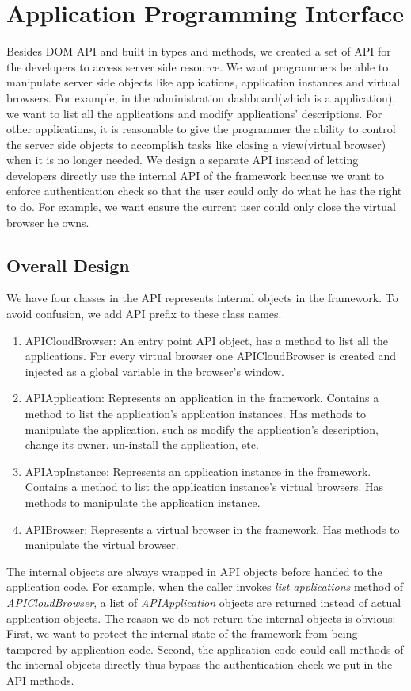 \chapter{Application Programming Interface}
\label{ch:api}
Besides DOM API and built in types and methods,
we created a set of API for the developers to access server side resource.
We want programmers be able to manipulate server side objects like
applications, application instances and virtual browsers.
For example, in the administration dashboard(which is a \cb application),
we want to list all the applications and modify applications' descriptions.
For other applications, it is reasonable to give the programmer
the ability to control the server side objects to accomplish
tasks like closing a view(virtual browser) when it is no longer needed.
We design a separate API instead of letting developers directly use the internal
API of the framework because we want to enforce authentication check so that 
the user could only do what he has the right to do.
For example, we want ensure the current user could only close the virtual browser
he owns.

\section{Overall Design}
We have four classes in the API represents internal objects in the framework.
To avoid confusion, we add API prefix to these class names.

\begin{enumerate}
\item APICloudBrowser: An entry point API object, 
has a method to list all the applications. 
For every virtual browser one APICloudBrowser is created and injected as
a global variable in the browser's window.

\item APIApplication: Represents an application in the framework.
Contains a method to list the application's application instances.
Has methods to manipulate the application, such as modify the application's
description, change its owner, un-install the application, etc.

\item APIAppInstance: Represents an application instance in the framework.
Contains a method to list the application instance's virtual browsers.
Has methods to manipulate the application instance.

\item APIBrowser: Represents a virtual browser in the framework.
Has methods to manipulate the virtual browser.
\end{enumerate}
The internal objects are always wrapped in API objects before handed
to the application code.
For example, when the caller invokes \emph{list applications} method
of \emph{APICloudBrowser}, a list of \emph{APIApplication} objects 
are returned instead of actual application objects.
The reason we do not return the internal objects is obvious:
First, we want to protect the internal state of the framework from 
being tampered by application code.
Second, 
the application code could call methods of the internal objects directly
thus bypass the authentication check we put in the API methods.

